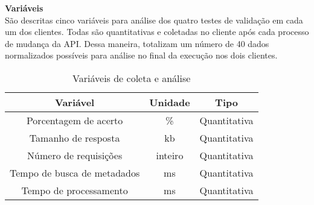 \textbf{Variáveis} \\

São descritas cinco variáveis para análise dos quatro testes de validação em cada um dos clientes. Todas são quantitativas e coletadas no cliente após cada processo de mudança da API. Dessa maneira, totalizam um número de 40 dados normalizados possíveis para análise no final da execução nos dois clientes.

\begin{table}[H]
  \centering
  \begin{tabular}{|c|c|c|}
    \hline
    Variável & Unidade & Tipo \\
    \hline
    Porcentagem de acerto & \% & Quantitativa \\
    \hline
    Tamanho de resposta & kb & Quantitativa \\
    \hline
    Número de requisições & inteiro & Quantitativa \\
    \hline
    Tempo de busca de metadados & ms & Quantitativa \\
    \hline
    Tempo de processamento & ms & Quantitativa \\
    \hline
  \end{tabular}
  \caption{Variáveis de coleta e análise}
\end{table}



